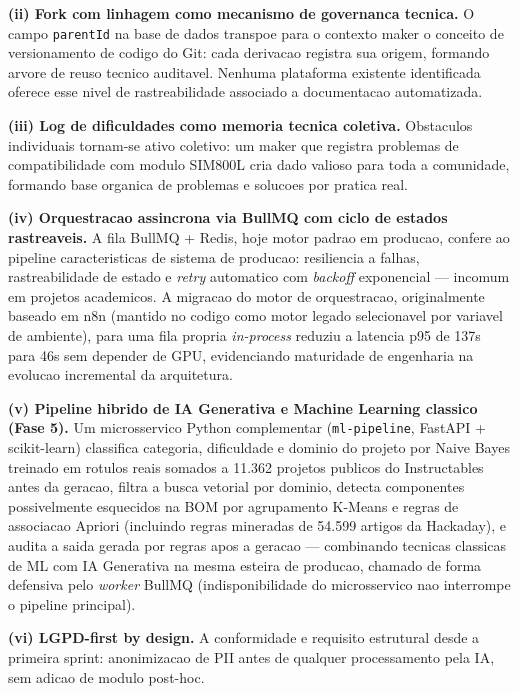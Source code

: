 \documentclass[portuguese]{sbcreviews-2025}%
\begin{document}
\textbf{(ii) Fork com linhagem como mecanismo de governanca tecnica.} O campo \texttt{parentId} na base de dados transpoe para o contexto maker o conceito de versionamento de codigo do Git: cada derivacao registra sua origem, formando arvore de reuso tecnico auditavel. Nenhuma plataforma existente identificada oferece esse nivel de rastreabilidade associado a documentacao automatizada.

\textbf{(iii) Log de dificuldades como memoria tecnica coletiva.} Obstaculos individuais tornam-se ativo coletivo: um maker que registra problemas de compatibilidade com modulo SIM800L cria dado valioso para toda a comunidade, formando base organica de problemas e solucoes por pratica real.

\textbf{(iv) Orquestracao assincrona via BullMQ com ciclo de estados rastreaveis.} A fila BullMQ + Redis, hoje motor padrao em producao, confere ao pipeline caracteristicas de sistema de producao: resiliencia a falhas, rastreabilidade de estado e \textit{retry} automatico com \textit{backoff} exponencial --- incomum em projetos academicos. A migracao do motor de orquestracao, originalmente baseado em n8n (mantido no codigo como motor legado selecionavel por variavel de ambiente), para uma fila propria \textit{in-process} reduziu a latencia p95 de 137s para 46s sem depender de GPU, evidenciando maturidade de engenharia na evolucao incremental da arquitetura.

\textbf{(v) Pipeline hibrido de IA Generativa e Machine Learning classico (Fase 5).} Um microsservico Python complementar (\texttt{ml-pipeline}, FastAPI + scikit-learn) classifica categoria, dificuldade e dominio do projeto por Naive Bayes treinado em rotulos reais somados a 11.362 projetos publicos do Instructables antes da geracao, filtra a busca vetorial por dominio, detecta componentes possivelmente esquecidos na BOM por agrupamento K-Means e regras de associacao Apriori (incluindo regras mineradas de 54.599 artigos da Hackaday), e audita a saida gerada por regras apos a geracao --- combinando tecnicas classicas de ML com IA Generativa na mesma esteira de producao, chamado de forma defensiva pelo \textit{worker} BullMQ (indisponibilidade do microsservico nao interrompe o pipeline principal).

\textbf{(vi) LGPD-first by design.} A conformidade e requisito estrutural desde a primeira sprint: anonimizacao de PII antes de qualquer processamento pela IA, sem adicao de modulo post-hoc.

\end{document}

